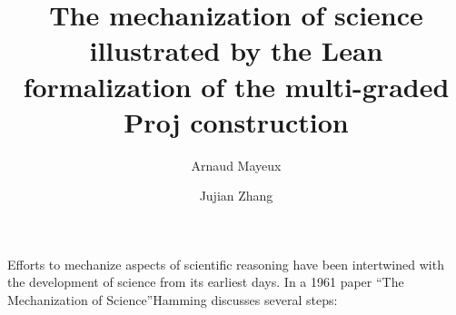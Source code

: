\documentclass[graybox]{svmult}
\begin{document}
\title*{The mechanization of science illustrated by the Lean formalization of the multi-graded Proj construction}

\author{Arnaud Mayeux \and Jujian Zhang}





\maketitle


Efforts to mechanize aspects of scientific reasoning have been intertwined with the development of science from its earliest days. In a 1961 paper \textquotedblleft The Mechanization of Science\textquotedblright Hamming discusses several steps:
 
\end{document}
